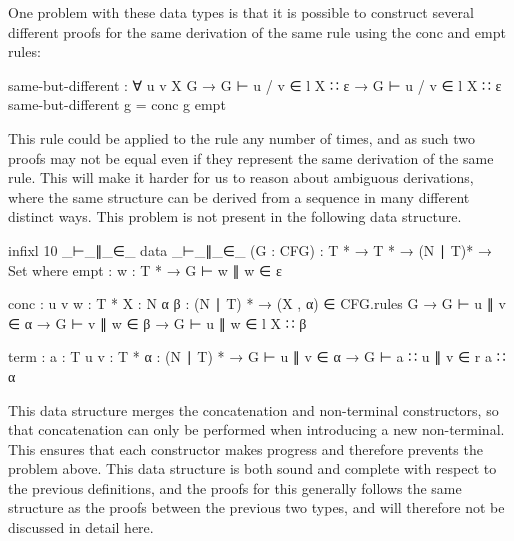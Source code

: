 	One problem with these data types is that it is possible to construct
	several different proofs for the same derivation of the same rule using the
	conc and empt rules:

	\begin{code}
		same-but-different : ∀ {u v X G} →
		  G ⊢ u / v ∈ l X ∷ ε →
		  G ⊢ u / v ∈ l X ∷ ε
		same-but-different g = conc g empt
	\end{code}

	This rule could be applied to the rule any number of times, and as such two
	proofs may not be equal even if they represent the same derivation of the
	same rule. This will make it harder for us to reason about ambiguous
	derivations, where the same structure can be derived from a sequence in
	many different distinct ways. This problem is not present in the following
	data structure.

	\begin{code}
		infixl 10 _⊢_∥_∈_
		data _⊢_∥_∈_ (G : CFG) : T * → T * → (N ∣ T)* → Set where
		  empt : {w : T *} →
		    G ⊢ w ∥ w ∈ ε

		  conc : {u v w : T *} {X : N} {α β : (N ∣ T) *} →
		    (X , α) ∈ CFG.rules G →
		    G ⊢ u ∥ v ∈ α →
		    G ⊢ v ∥ w ∈ β →
		      G ⊢ u ∥ w ∈ l X ∷ β

		  term : {a : T} {u v : T *} {α : (N ∣ T) *} →
		    G ⊢ u ∥ v ∈ α →
		      G ⊢ a ∷ u ∥ v ∈ r a ∷ α
	\end{code}

	This data structure merges the concatenation and non-terminal constructors,
	so that concatenation can only be performed when introducing a new
	non-terminal. This ensures that each constructor makes progress and
	therefore prevents the problem above. This data structure is both sound and
	complete with respect to the previous definitions, and the proofs for this
	generally follows the same structure as the proofs between the previous two
	types, and will therefore not be discussed in detail here.
